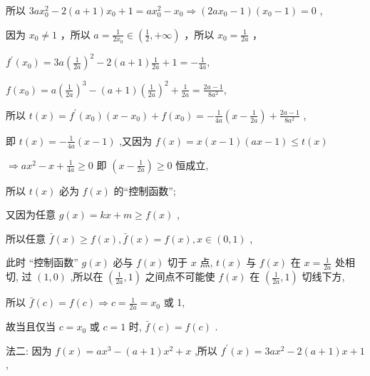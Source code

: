 \documentclass[10pt]{article}
\begin{document}
所以 \({3a}{x}_{0}^{2} - 2\left( {a + 1}\right) {x}_{0} + 1 = a{x}_{0}^{2} - {x}_{0} \Rightarrow  \left( {{2a}{x}_{0} - 1}\right) \left( {{x}_{0} - 1}\right)  = 0\) ,

因为 \({x}_{0} \neq  1\) ，所以 \(a = \frac{1}{2{x}_{0}} \in  \left( {\frac{1}{2}, + \infty }\right)\) ，所以 \({x}_{0} = \frac{1}{2a}\) ，

\({f}^{\prime }\left( {x}_{0}\right)  = {3a}{\left( \frac{1}{2a}\right) }^{2} - 2\left( {a + 1}\right) \frac{1}{2a} + 1 =  - \frac{1}{4a},\)

\(f\left( {x}_{0}\right)  = a{\left( \frac{1}{2a}\right) }^{3} - \left( {a + 1}\right) {\left( \frac{1}{2a}\right) }^{2} + \frac{1}{2a} = \frac{{2a} - 1}{8{a}^{2}},\)

所以 \(t\left( x\right)  = {f}^{\prime }\left( {x}_{0}\right) \left( {x - {x}_{0}}\right)  + f\left( {x}_{0}\right)  =  - \frac{1}{4a}\left( {x - \frac{1}{2a}}\right)  + \frac{{2a} - 1}{8{a}^{2}}\) ,

即 \(t\left( x\right)  =  - \frac{1}{4a}\left( {x - 1}\right)\) ,又因为 \(f\left( x\right)  = x\left( {x - 1}\right) \left( {{ax} - 1}\right)  \leq  t\left( x\right)\)

\(\Rightarrow  a{x}^{2} - x + \frac{1}{4a} \geq  0\) 即 \(\left( {x - \frac{1}{2a}}\right)  \geq  0\) 恒成立,

所以 \(t\left( x\right)\) 必为 \(f\left( x\right)\) 的“控制函数”;

又因为任意 \(g\left( x\right)  = {kx} + m \geq  f\left( x\right)\) ,

所以任意 \(\bar{f}\left( x\right)  \geq  f\left( x\right) ,\bar{f}\left( x\right)  = f\left( x\right) ,x \in  \left( {0,1}\right)\) ,

此时 “控制函数” \(g\left( x\right)\) 必与 \(f\left( x\right)\) 切于 \(x\) 点, \(t\left( x\right)\) 与 \(f\left( x\right)\) 在 \(x = \frac{1}{2a}\) 处相切, 过 \(\left( {1,0}\right)\) ,所以在 \(\left( {\frac{1}{2a},1}\right)\) 之间点不可能使 \(f\left( x\right)\) 在 \(\left( {\frac{1}{2a},1}\right)\) 切线下方,

所以 \(\bar{f}\left( c\right)  = f\left( c\right)  \Rightarrow  c = \frac{1}{2a} = {x}_{0}\) 或 1,

故当且仅当 \(c = {x}_{0}\) 或 \(c = 1\) 时, \(\bar{f}\left( c\right)  = f\left( c\right)\) .

法二: 因为 \(f\left( x\right)  = a{x}^{3} - \left( {a + 1}\right) {x}^{2} + x\) ,所以 \({f}^{\prime }\left( x\right)  = {3a}{x}^{2} - 2\left( {a + 1}\right) x + 1\) ,
\end{document}
